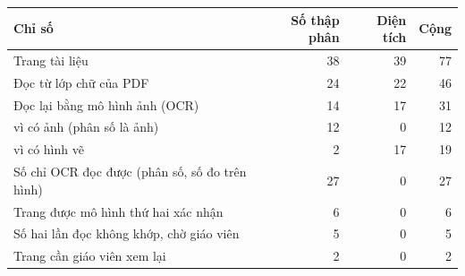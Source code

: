 \small
\begin{tabular}{@{}>{\raggedright\arraybackslash}p{3.4cm}rrr@{}}
\toprule
Chỉ số & Số thập phân & Diện tích & Cộng \\
\midrule
Trang tài liệu & 38 & 39 & 77 \\
\midrule
Đọc từ lớp chữ của PDF & 24 & 22 & 46 \\
Đọc lại bằng mô hình ảnh (OCR) & 14 & 17 & 31 \\
\midrule
\quad vì có ảnh (phân số là ảnh) & 12 & 0 & 12 \\
\quad vì có hình vẽ & 2 & 17 & 19 \\
\midrule
Số chỉ OCR đọc được (phân số, số đo trên hình) & 27 & 0 & 27 \\
Trang được mô hình thứ hai xác nhận & 6 & 0 & 6 \\
Số hai lần đọc không khớp, chờ giáo viên & 5 & 0 & 5 \\
Trang cần giáo viên xem lại & 2 & 0 & 2 \\
\bottomrule
\end{tabular}
